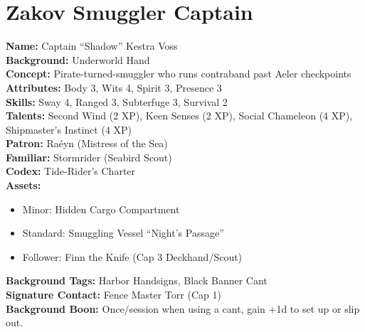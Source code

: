 \documentclass[11pt]{article}
\begin{document}
\section{Zakov Smuggler Captain}
\textbf{Name:} Captain ``Shadow'' Kestra Voss \\
\textbf{Background:} Underworld Hand \\
\textbf{Concept:} Pirate-turned-smuggler who runs contraband past Aeler checkpoints \\
\textbf{Attributes:} Body 3, Wits 4, Spirit 3, Presence 3 \\
\textbf{Skills:} Sway 4, Ranged 3, Subterfuge 3, Survival 2 \\
\textbf{Talents:} Second Wind (2 XP), Keen Senses (2 XP), Social Chameleon (4 XP), Shipmaster's Instinct (4 XP) \\
\textbf{Patron:} Raéyn (Mistress of the Sea) \\
\textbf{Familiar:} Stormrider (Seabird Scout) \\
\textbf{Codex:} Tide-Rider's Charter \\
\textbf{Assets:}
\begin{itemize}
    \item Minor: Hidden Cargo Compartment
    \item Standard: Smuggling Vessel ``Night's Passage''
    \item Follower: Finn the Knife (Cap 3 Deckhand/Scout)
\end{itemize}
\textbf{Background Tags:} Harbor Handsigns, Black Banner Cant \\
\textbf{Signature Contact:} Fence Master Torr (Cap 1) \\
\textbf{Background Boon:} Once/session when using a cant, gain +1d to set up or slip out.
\end{document}
